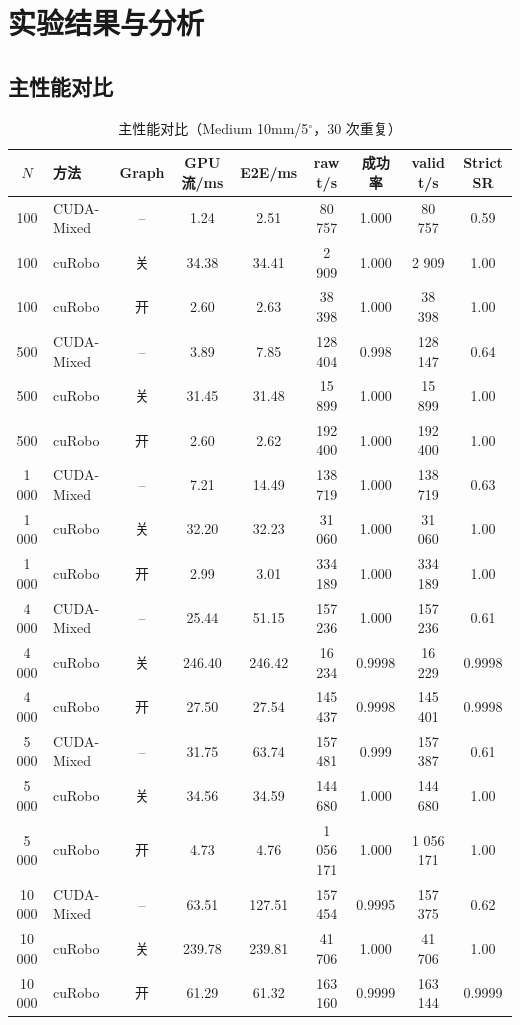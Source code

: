 \documentclass[twocolumn,a4paper,10pt]{ctexart}
\begin{document}
\section{实验结果与分析}\label{sec:results}

\subsection{主性能对比}

\begin{table}[ht]
\centering\small
\caption{主性能对比（Medium 10mm/5$^\circ$，30 次重复）}
\label{tab:maincomp}
\begin{tabular}{clccccccc}
\toprule
$N$ & 方法 & Graph & GPU流/ms & E2E/ms & raw t/s & 成功率 & valid t/s & Strict SR \\
\midrule
100 & CUDA-Mixed & -- & 1.24 & 2.51 & 80 757 & 1.000 & 80 757 & 0.59 \\
100 & cuRobo & 关 & 34.38 & 34.41 & 2 909 & 1.000 & 2 909 & 1.00 \\
100 & cuRobo & 开 & 2.60 & 2.63 & 38 398 & 1.000 & 38 398 & 1.00 \\
\midrule
500 & CUDA-Mixed & -- & 3.89 & 7.85 & 128 404 & 0.998 & 128 147 & 0.64 \\
500 & cuRobo & 关 & 31.45 & 31.48 & 15 899 & 1.000 & 15 899 & 1.00 \\
500 & cuRobo & 开 & 2.60 & 2.62 & 192 400 & 1.000 & 192 400 & 1.00 \\
\midrule
1 000 & CUDA-Mixed & -- & 7.21 & 14.49 & 138 719 & 1.000 & 138 719 & 0.63 \\
1 000 & cuRobo & 关 & 32.20 & 32.23 & 31 060 & 1.000 & 31 060 & 1.00 \\
1 000 & cuRobo & 开 & 2.99 & 3.01 & 334 189 & 1.000 & 334 189 & 1.00 \\
\midrule
4 000 & CUDA-Mixed & -- & 25.44 & 51.15 & 157 236 & 1.000 & 157 236 & 0.61 \\
4 000 & cuRobo & 关 & 246.40 & 246.42 & 16 234 & 0.9998 & 16 229 & 0.9998 \\
4 000 & cuRobo & 开 & 27.50 & 27.54 & 145 437 & 0.9998 & 145 401 & 0.9998 \\
\midrule
5 000 & CUDA-Mixed & -- & 31.75 & 63.74 & 157 481 & 0.999 & 157 387 & 0.61 \\
5 000 & cuRobo & 关 & 34.56 & 34.59 & 144 680 & 1.000 & 144 680 & 1.00 \\
5 000 & cuRobo & 开 & 4.73 & 4.76 & 1 056 171 & 1.000 & 1 056 171 & 1.00 \\
\midrule
10 000 & CUDA-Mixed & -- & 63.51 & 127.51 & 157 454 & 0.9995 & 157 375 & 0.62 \\
10 000 & cuRobo & 关 & 239.78 & 239.81 & 41 706 & 1.000 & 41 706 & 1.00 \\
10 000 & cuRobo & 开 & 61.29 & 61.32 & 163 160 & 0.9999 & 163 144 & 0.9999 \\
\bottomrule
\end{tabular}
\end{table}
\end{document}
